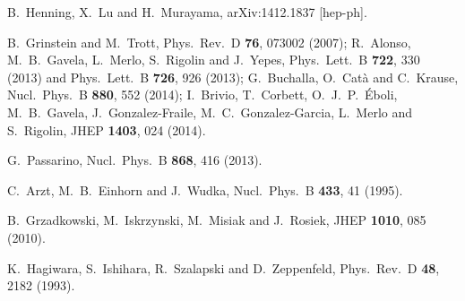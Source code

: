   B.~Henning, X.~Lu and H.~Murayama,
  arXiv:1412.1837 [hep-ph].
  
  B.~Grinstein and M.~Trott,
  Phys.\ Rev.\ D {\bf 76}, 073002 (2007);
  R.~Alonso, M.~B.~Gavela, L.~Merlo, S.~Rigolin and J.~Yepes,
  Phys.\ Lett.\ B {\bf 722}, 330 (2013) and 
  Phys.\ Lett.\ B {\bf 726}, 926 (2013);
  G.~Buchalla, O.~Cat\`a and C.~Krause,
  Nucl.\ Phys.\ B {\bf 880}, 552 (2014);
  I.~Brivio, T.~Corbett, O.~J.~P.~\'Eboli, M.~B.~Gavela, J.~Gonzalez-Fraile, M.~C.~Gonzalez-Garcia, L.~Merlo and S.~Rigolin,
  JHEP {\bf 1403}, 024 (2014).

  G.~Passarino,
  Nucl.\ Phys.\ B {\bf 868}, 416 (2013).
  
  C.~Arzt, M.~B.~Einhorn and J.~Wudka,
  Nucl.\ Phys.\ B {\bf 433}, 41 (1995).

  B.~Grzadkowski, M.~Iskrzynski, M.~Misiak and J.~Rosiek,
  JHEP {\bf 1010}, 085 (2010).

  K.~Hagiwara, S.~Ishihara, R.~Szalapski and D.~Zeppenfeld,
  Phys.\ Rev.\ D {\bf 48}, 2182 (1993).
  
